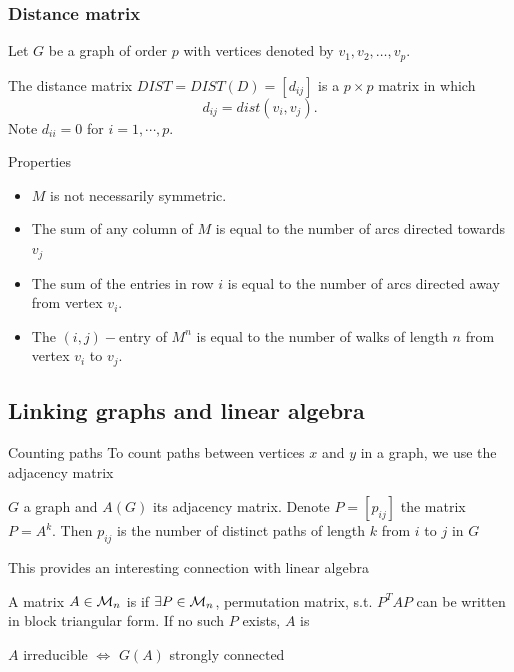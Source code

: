 \documentclass[aspectratio=43]{beamer}
\begin{document}
\begin{frame}\frametitle{Distance matrix}
	Let $G$ be a graph of order $p$ with vertices denoted by $v_1, v_2, \dots , v_p$.
	\begin{definition}
	The distance matrix $DIST=DIST(D)=[d_{ij}]$ is a $p\times p$ matrix in which
	$$d_{ij}=
	dist(v_i,v_j).
	$$
	Note $d_{ii}=0$ for $i=1,\cdots, p$.
	\end{definition}

	\begin{definition}{Properties}
		\begin{itemize}
		\item $M$ is not necessarily symmetric.
		\item The sum of any column of $M$ is equal to the number of arcs directed towards $v_j$
		\item The sum of the entries in row $i$ is equal to the number of arcs directed away from vertex $v_i$.
		\item The $(i,j)-$entry of $M^n$ is equal to the number of walks of length $n$ from vertex $v_i$ to $v_j$.
		\end{itemize}
	\end{definition}
\end{frame}



\subsection{Linking graphs and linear algebra}

\begin{frame}{Counting paths}
	To count paths between vertices $x$ and $y$ in a graph, we use the adjacency matrix
	\vfill
	\begin{theorem}
		$G$ a graph and $A(G)$ its adjacency matrix. Denote $P=[p_{ij}]$ the matrix $P=A^k$. Then $p_{ij}$ is the number of distinct paths of length $k$ from $i$ to $j$ in $G$
	\end{theorem}
	\vfill
	This provides an interesting connection with linear algebra
	\begin{definition}
		A matrix $A\in\mathcal{M}_n$ is  if $\exists P\in\mathcal{M}_n$, permutation matrix, s.t. $P^TAP$ can be written in block triangular form. If no such $P$ exists, $A$ is 
	\end{definition}
	\vfill
	\begin{theorem}
		$A$ irreducible $\iff$ $G(A)$ strongly connected
	\end{theorem}
\end{frame}
\end{document}
